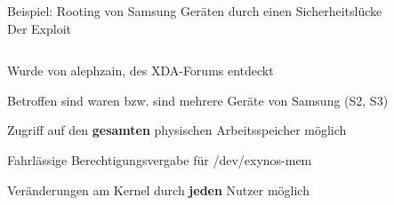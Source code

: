 \begin{frame}
	\centering
	Beispiel: Rooting von Samsung Geräten durch einen Sicherheitslücke\\
	\centering 
	Der Exploit
	\begin{columns}[T] %
    	\begin{column}[T]{5cm} %
    		\begin{block}{}
    			Wurde von alephzain, des XDA-Forums entdeckt
    		\end{block}
    		\begin{block}{}
				Betroffen sind waren bzw. sind mehrere Geräte von Samsung (S2, S3)
			\end{block}
			\begin{block}{}
				Zugriff auf den \textbf{gesamten} physischen Arbeitsspeicher möglich
			\end{block}
			\begin{block}{}
				Fahrlässige Berechtigungsvergabe für /dev/exynos-mem
			\end{block}
			\begin{block}{}
				Veränderungen am Kernel durch \textbf{jeden} Nutzer möglich
			\end{block}
    	\end{column}
	\end{columns}

\end{frame}